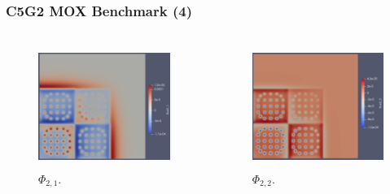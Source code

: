 \begin{frame}
\frametitle{C5G2 MOX Benchmark (4)}
\begin{columns}
    \column[t]{5cm}
	\begin{figure}[htbp!]
		\begin{center}
			\includegraphics[height=4cm]{flux2_1}
		\end{center}
		\caption{$\Phi_{2, 1}$.}
	\end{figure}

	\column[t]{5cm}
	\begin{figure}[htbp!]
		\begin{center}
			\includegraphics[height=4cm]{flux2_2}
		\end{center}
		\caption{$\Phi_{2, 2}$.}
	\end{figure}
\end{columns}
\end{frame}